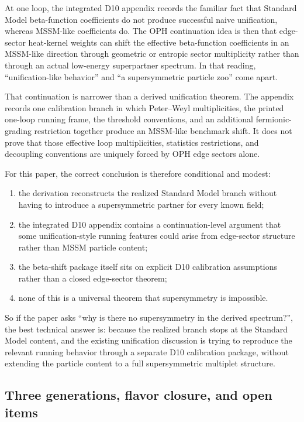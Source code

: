 \documentclass[11pt]{article}
\begin{document}
At one loop, the integrated D10 appendix records the familiar fact that Standard Model beta-function
coefficients do not produce successful naive unification, whereas MSSM-like coefficients do. The
OPH continuation idea is then that edge-sector heat-kernel weights can shift the effective
beta-function coefficients in an MSSM-like direction through geometric or entropic sector
multiplicity rather than through an actual low-energy superpartner spectrum. In that reading,
``unification-like behavior'' and ``a supersymmetric particle zoo'' come apart.

That continuation is narrower than a derived unification theorem. The appendix records one
calibration branch in which Peter--Weyl multiplicities, the printed one-loop running frame, the
threshold conventions, and an additional fermionic-grading restriction together produce an
MSSM-like benchmark shift. It does not prove that those effective loop multiplicities,
statistics restrictions, and decoupling conventions are uniquely forced by OPH edge sectors alone.

For this paper, the correct conclusion is therefore conditional and modest:
\begin{enumerate}[leftmargin=2em]
\item the derivation reconstructs the realized Standard Model branch without having to
introduce a supersymmetric partner for every known field;
\item the integrated D10 appendix contains a continuation-level argument that some unification-style running
features could arise from edge-sector structure rather than MSSM particle content;
\item the beta-shift package itself sits on explicit D10 calibration assumptions rather than a closed edge-sector theorem;
\item none of this is a universal theorem that supersymmetry is impossible.
\end{enumerate}

So if the paper asks ``why is there no supersymmetry in the derived spectrum?'', the best
technical answer is: because the realized branch stops at the Standard
Model content, and the existing unification discussion is trying to reproduce the relevant
running behavior through a separate D10 calibration package, without extending the particle content to a full
supersymmetric multiplet structure.

\subsection{Three generations, flavor closure, and open items}
\end{document}
